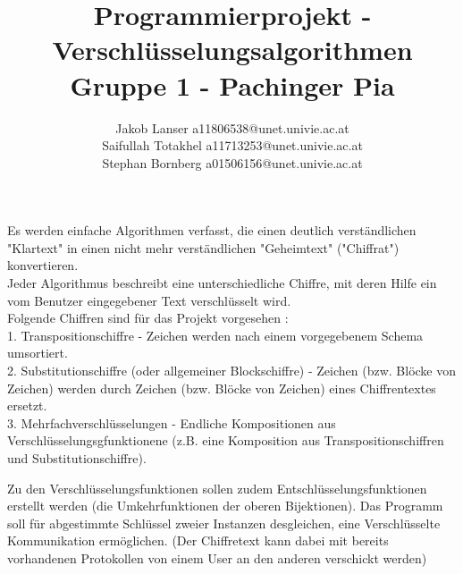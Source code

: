 \documentclass{article}
\title{Programmierprojekt - Verschlüsselungsalgorithmen\\Gruppe 1 -  Pachinger Pia}
\author{Jakob Lanser a11806538@unet.univie.ac.at\\Saifullah Totakhel a11713253@unet.univie.ac.at\\Stephan Bornberg a01506156@unet.univie.ac.at}
\begin{document}
\maketitle

Es werden einfache Algorithmen verfasst, die einen deutlich verständlichen "Klartext" in einen nicht mehr verständlichen "Geheimtext" ("Chiffrat") konvertieren.\\
Jeder Algorithmus beschreibt eine unterschiedliche Chiffre, mit deren Hilfe ein vom Benutzer eingegebener Text verschlüsselt wird.\\
Folgende Chiffren sind für das Projekt vorgesehen :\\
1. Transpositionschiffre - Zeichen werden nach einem vorgegebenem Schema umsortiert.\\
2. Substitutionschiffre (oder allgemeiner Blockschiffre) - Zeichen (bzw. Blöcke von Zeichen) werden durch Zeichen (bzw. Blöcke von Zeichen) eines Chiffrentextes ersetzt.\\
3. Mehrfachverschlüsselungen - Endliche Kompositionen aus Verschlüsselungsgfunktionene (z.B. eine Komposition aus Transpositionschiffren und Substitutionschiffre).

Zu den Verschlüsselungsfunktionen sollen zudem Entschlüsselungsfunktionen erstellt werden (die Umkehrfunktionen der oberen Bijektionen). Das Programm soll für abgestimmte Schlüssel zweier Instanzen desgleichen, eine Verschlüsselte Kommunikation ermöglichen. (Der Chiffretext kann dabei mit bereits vorhandenen Protokollen von einem User an den anderen verschickt werden)
\end{document}
